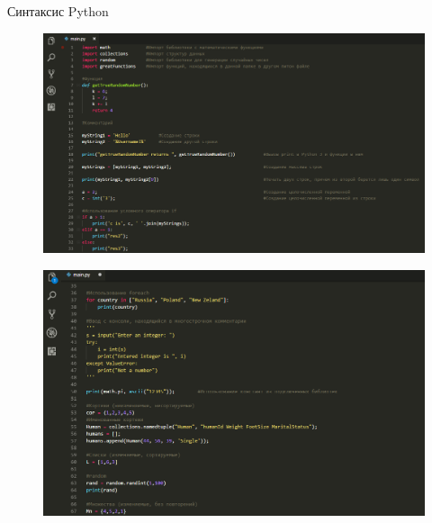 \documentclass[8pt,pdf,hyperref={unicode}, xcolor=dvipsnames, fleqn]{beamer}
\begin{document}
\begin{frame}{Синтаксис Python}


\begin{figure}
	\includegraphics[width=1.0\textwidth]{Images/main1.png}
\end{figure}


\end{frame}
\begin{frame}{}


\begin{figure}
	\includegraphics[width=1.0\textwidth]{Images/main2.png}
\end{figure}


\end{frame}
\end{document}
